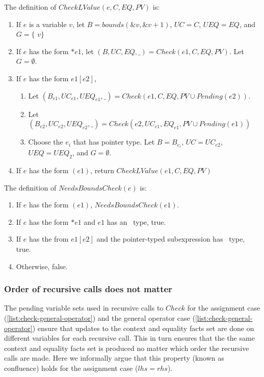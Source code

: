 The definition of $CheckLValue(e, C, EQ, PV)$ is:
\begin{enumerate}
\item If $e$ is a variable $v$, let $B = bounds(\&v,\&v + 1)$,  $UC = C$, $UEQ=EQ$, and 
$G=\{$ \code{&}$v \}$
\item If $e$ has the form $*e1$,  let $(B, UC, EQ, \_) = Check(e1, C, EQ, PV)$.  Let $G =\emptyset$.
\item If $e$ has the form $e1[e2]$,
\begin{enumerate}
\item Let $(B_{e1}, {UC}_{e1}, {UEQ}_{e1}, \_) = Check(e1, C, EQ, PV \cup Pending(e2))$.
\item Let $(B_{e2}, {UC}_{e2}, {UEQ}_{e2}, \_) = Check(e2, {UC}_{e1}, {EQ}_{e1},
         PV \cup Pending(e1))$
\item Choose the $e_i$ that has pointer type.   Let $B = B_{e_i}$, $UC = {UC}_{e2}$, 
$UEQ  = {UEQ}_2$, and $G=\emptyset$.
\end{enumerate}
\item If $e$ has the form $(e1)$, return $CheckLValue(e1, C, EQ, PV)$
\end{enumerate}

The definition of $NeedsBoundsCheck(e)$ is:
\begin{enumerate}
\item If $e$ has the form $(e1)$, $NeedsBoundsCheck(e1).$
\item If $e$ has the form $*e1$ and $e1$ has an \arrayptr\ type, true.
\item If $e$ has the from $e1[e2]$ and the pointer-typed subexpression has \arrayptr\ type, true.
\item Otherwise, false.
\end{enumerate}

\subsubsection{Order of recursive calls does not matter}

The pending variable sets used in recursive calls to $Check$ for the assignment case
(\ref{list:check-general-operator}) and the general operator case  (\ref{list:check-general-operator})
ensure that updates to the context and equality facts set are done on different variables
for each recursive call.  This in turn ensures that the the same context and equality facts
set is produced no matter which order the recursive calls are made.   Here we informally argue 
that this property (known as confluence) holds for the assignment  case ($lhs = rhs$).   

